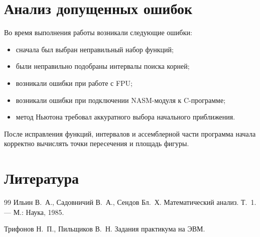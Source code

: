 \documentclass[a4paper,12pt]{article}
\begin{document}
\newpage
\section{Анализ допущенных ошибок}
Во время выполнения работы возникали следующие ошибки:
\begin{itemize}
    \item сначала был выбран неправильный набор функций;
    \item были неправильно подобраны интервалы поиска корней;
    \item возникали ошибки при работе с FPU;
    \item возникали ошибки при подключении NASM-модуля к C-программе;
    \item метод Ньютона требовал аккуратного выбора начального приближения.
\end{itemize}

После исправления функций, интервалов и ассемблерной части программа начала корректно вычислять точки пересечения и площадь фигуры.

\newpage
\section{Литература}
\begin{thebibliography}{99}
Ильин В.~А., Садовничий В.~А., Сендов Бл.~Х.
Математический анализ. Т.~1.
--- М.: Наука, 1985.

Трифонов Н.~П., Пильщиков В.~Н.
Задания практикума на ЭВМ.
\end{thebibliography}
\end{document}
